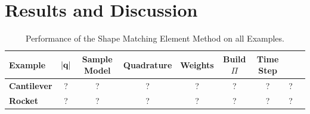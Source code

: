 %
\section{Results and Discussion}



\begin{table}[h]
  \caption{Performance of the Shape Matching Element Method on all Examples.}
  \label{tbl:compare}
  \begin{center}
  \begin{tabular}{l c c c c c c c c}
   \textbf{Example} & $|\mathbf{q}|$ &  \textbf{Sample Model} & \textbf{Quadrature} & \textbf{Weights} & \textbf{Build $\Pi$} & \textbf{Time Step} \\
   \hline 
   \rowcolor[HTML]{DAE8FC} 
   \textbf{Cantilever}  & ? & ? & ? & ? & ? & ? & ? \\
   \textbf{Rocket}      & ? & ? & ? & ? & ? & ? & ? \\
   \hline
  \end{tabular}
  \end{center}
  
  \end{table}

